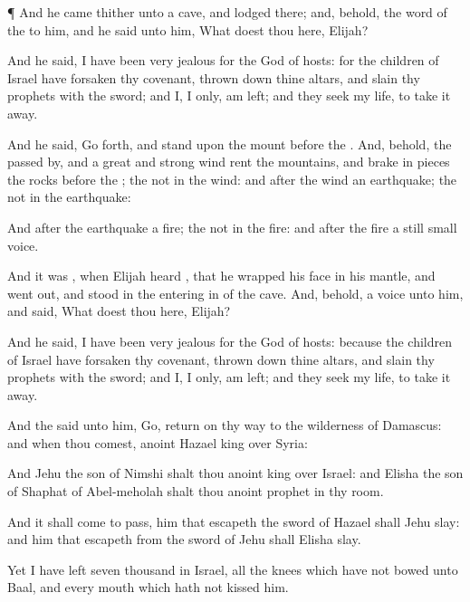 {\par }{\PP {}¶ And he
came thither unto a
cave, and
lodged there; and, behold, the
word of the
{}
{} to him, and he
said unto him, What doest thou here,
Elijah?

And he
said, I have been
very
jealous for the
{}
God of
hosts: for the
children of
Israel have
forsaken thy
covenant, thrown
down thine
altars, and
slain thy
prophets with the
sword; and I,
{} I only, am
left; and they
seek my
life, to take it
away.

And he
said, Go
forth, and
stand upon the
mount
before the
{}. And, behold, the
{} passed
by, and a
great and
strong
wind
rent the
mountains, and brake in
pieces the
rocks
before the
{};
{} the
{}
{} not in the
wind: and
after the
wind an
earthquake;
{} the
{}
{} not in the
earthquake:

And
after the
earthquake a
fire;
{} the
{}
{} not in the
fire: and
after the
fire a
still
small
voice.

And it was
{}, when
Elijah
heard
{}, that he
wrapped his
face in his
mantle, and went
out, and
stood in the entering
in of the
cave. And, behold,
{} a
voice unto him, and
said, What doest thou here,
Elijah?

And he
said, I have been
very
jealous for the
{}
God of
hosts: because the
children of
Israel have
forsaken thy
covenant, thrown
down thine
altars, and
slain thy
prophets with the
sword; and I,
{} I only, am
left; and they
seek my
life, to take it
away.

And the
{}
said unto him,
Go,
return on thy
way to the
wilderness of
Damascus: and when thou
comest,
anoint
Hazael
{}
king over
Syria:

And
Jehu the
son of
Nimshi shalt thou
anoint
{}
king over
Israel: and
Elisha the
son of
Shaphat of
Abel-meholah shalt thou
anoint
{}
prophet in thy room.

And it shall come to pass,
{} him that
escapeth the
sword of
Hazael shall
Jehu
slay: and him that
escapeth from the
sword of
Jehu shall
Elisha
slay.

Yet I have
left
{}
seven
thousand in
Israel, all the
knees which have not
bowed unto
Baal, and every
mouth which hath not
kissed him.


}
